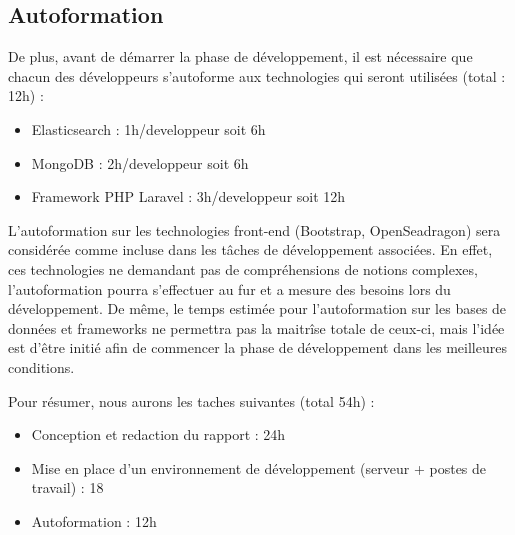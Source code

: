     \subsection{Autoformation}
        De plus, avant de démarrer la phase de développement, il est nécessaire que chacun des développeurs s'autoforme aux technologies qui seront utilisées (total : 12h) :
        \begin{itemize}
            \item Elasticsearch : 1h/developpeur soit 6h
            \item MongoDB : 2h/developpeur soit 6h
            \item Framework PHP Laravel : 3h/developpeur soit 12h
        \end{itemize}

        L'autoformation sur les technologies front-end (Bootstrap, OpenSeadragon) sera considérée comme incluse dans les tâches de développement associées. En effet, ces technologies ne demandant pas de compréhensions de notions complexes, l'autoformation pourra s'effectuer au fur et a mesure des besoins lors du développement.
        De même, le temps estimée pour l'autoformation sur les bases de données et frameworks ne permettra pas la maitrîse totale de ceux-ci, mais l'idée est d'être initié afin de commencer la phase de développement dans les meilleures conditions.

        Pour résumer, nous aurons les taches suivantes (total 54h) :
        \begin{itemize}
            \item Conception et redaction du rapport : 24h
            \item Mise en place d'un environnement de développement (serveur + postes de travail) : 18
            \item Autoformation : 12h
        \end{itemize}